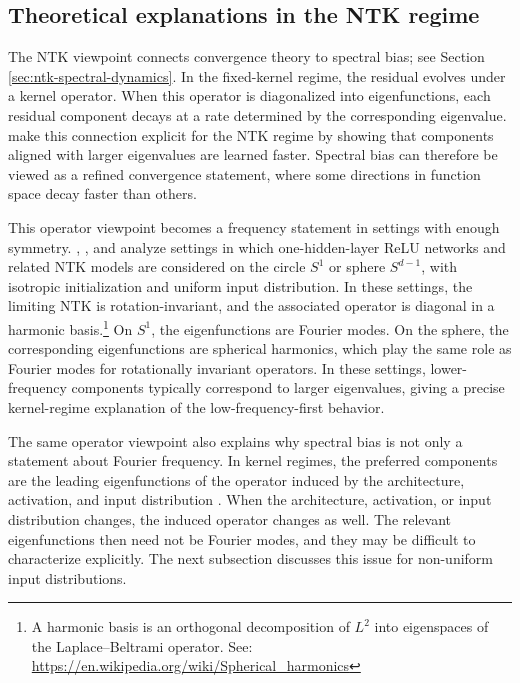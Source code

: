 \begin{revblock}
	\subsection{Theoretical explanations in the NTK regime}

	The NTK viewpoint connects convergence theory to spectral bias; see Section~
	\ref{sec:ntk-spectral-dynamics}. In the fixed-kernel regime, the residual
	evolves under a kernel operator. When this operator is diagonalized into
	eigenfunctions, each residual component decays at a rate determined by the
	corresponding eigenvalue. \citet{cao2020understandingspectralbiasdeep} make
	this connection explicit for the NTK regime by showing that components aligned
	with larger eigenvalues are learned faster. Spectral bias can therefore be
	viewed as a refined convergence statement, where some directions in function
	space decay faster than others.

	This operator viewpoint becomes a frequency statement in settings with
	enough symmetry. \citet{basri2019convergence},
	\citet{bietti2019inductivebiasneuraltangent}, and
	\citet{cao2020understandingspectralbiasdeep} analyze settings in which
	one-hidden-layer ReLU networks and related NTK models are considered on the
	circle \(S^1\) or sphere \(S^{d-1}\), with isotropic initialization and uniform
	input distribution. In these settings, the limiting NTK is rotation-invariant,
	and the associated operator is diagonal in a harmonic basis.\footnote{A harmonic
		basis is an orthogonal decomposition of \(L^2\) into eigenspaces of the
		Laplace--Beltrami operator. See: \href{https://en.wikipedia.org/wiki/Spherical_harmonics}
		{https://en.wikipedia.org/wiki/Spherical\_harmonics}} On
	\(S^1\), the eigenfunctions are Fourier modes. On the sphere, the corresponding
	eigenfunctions are spherical harmonics, which play the same role as Fourier
	modes for rotationally invariant operators. In these settings, lower-frequency
	components typically correspond to larger eigenvalues, giving a precise
	kernel-regime explanation of the low-frequency-first behavior.

	The same operator viewpoint also explains why spectral bias is not only a
	statement about Fourier frequency. In kernel regimes, the preferred components
	are the leading eigenfunctions of the operator induced by the architecture,
	activation, and input distribution
	\citep{jacot2018ntk,cao2020understandingspectralbiasdeep,
		bowman2022spectralbiasoutsidetraining}. When the architecture, activation,
	or input distribution changes, the induced operator changes as well. The
	relevant eigenfunctions then need not be Fourier modes, and they may be
	difficult to characterize explicitly. The next subsection discusses this issue
	for non-uniform input distributions.

\end{revblock}

